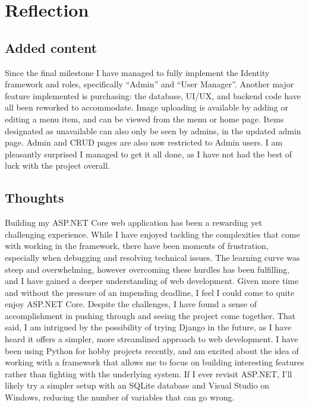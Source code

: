 \documentclass{article}
\begin{document}
\section{Reflection}
\subsection{Added content}
Since the final milestone I have managed to fully implement the Identity framework and roles, specifically ``Admin'' and ``User Manager''. Another major feature implemented is purchasing: the database, UI/UX, and backend code have all been reworked to accommodate. Image uploading is available by adding or editing a menu item, and can be viewed from the menu or home page. Items designated as unavailable can also only be seen by admins, in the updated admin page. Admin and CRUD pages are also now restricted to Admin users. I am pleasantly surprised I managed to get it all done, as I have not had the best of luck with the project overall.

\subsection{Thoughts}
Building my ASP.NET Core web application has been a rewarding yet challenging experience. While I have  enjoyed tackling the complexities that come with working in the framework, there have been moments of frustration, especially when debugging and resolving technical issues. The learning curve was steep and overwhelming, however overcoming these hurdles has been fulfilling, and I have gained a deeper understanding of web development. Given more time and without the pressure of an impending deadline, I feel I could come to quite enjoy ASP.NET Core. Despite the challenges, I have found a sense of accomplishment in pushing through and seeing the project come together. That said, I am intrigued by the possibility of trying Django in the future, as I have heard it offers a simpler, more streamlined approach to web development. I have been using Python for hobby projects recently, and am excited about the idea of working with a framework that allows me to focus on building interesting features rather than fighting with the underlying system. If I ever revisit ASP.NET, I'll likely try a simpler setup with an SQLite database and Visual Studio on Windows, reducing the number of variables that can go wrong.
\end{document}
